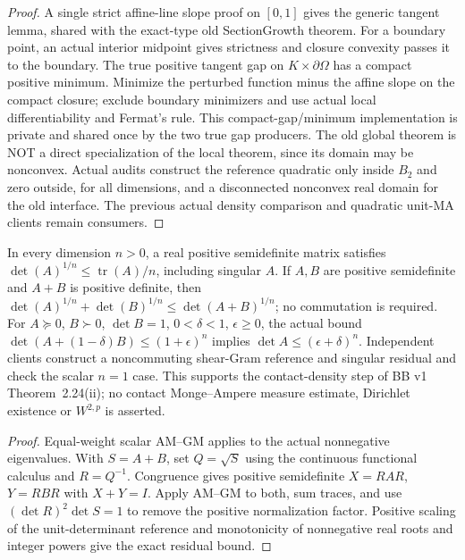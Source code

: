 \begin{proof}
  \leanok
  A single strict affine-line slope proof on $[0,1]$ gives the generic tangent
  lemma, shared with the exact-type old SectionGrowth theorem. For a boundary
  point, an actual interior midpoint gives strictness and closure convexity
  passes it to the boundary. The true positive tangent gap on
  $K\times\partial\Omega$ has a compact positive minimum. Minimize the perturbed
  function minus the affine slope on the compact closure; exclude boundary
  minimizers and use actual local differentiability and Fermat's rule.
  This compact-gap/minimum implementation is private and shared once by the two
  true gap producers. The old global theorem is NOT a direct specialization of
  the local theorem, since its domain may be nonconvex. Actual audits construct
  the reference quadratic only inside $B_2$ and zero outside, for all dimensions,
  and a disconnected nonconvex real domain for the old interface. The previous
  actual density comparison and quadratic unit-MA clients remain consumers.
\end{proof}


\begin{lemma}
  \label{lem:matrix-determinant-minkowski}
  \leanok
  In every dimension $n>0$, a real positive semidefinite matrix satisfies
  $\det(A)^{1/n}\le\operatorname{tr}(A)/n$, including singular $A$.
  If $A,B$ are positive semidefinite and $A+B$ is positive definite, then
  $\det(A)^{1/n}+\det(B)^{1/n}\le\det(A+B)^{1/n}$; no commutation is required.
  For $A\succeq0$, $B\succ0$, $\det B=1$, $0<\delta<1$, $\epsilon\ge0$,
  the actual bound $\det(A+(1-\delta)B)\le(1+\epsilon)^n$ implies
  $\det A\le(\epsilon+\delta)^n$. Independent clients construct a noncommuting
  shear-Gram reference and singular residual and check the scalar $n=1$ case.
  This supports the contact-density step of BB v1 Theorem~2.24(ii); no contact
  Monge--Ampere measure estimate, Dirichlet existence or $W^{2,p}$ is asserted.
\end{lemma}
\begin{proof}
  \leanok
  Equal-weight scalar AM--GM applies to the actual nonnegative eigenvalues.
  With $S=A+B$, set $Q=\sqrt S$ using the continuous functional calculus and
  $R=Q^{-1}$. Congruence gives positive semidefinite $X=RAR$, $Y=RBR$ with
  $X+Y=I$. Apply AM--GM to both, sum traces, and use
  $(\det R)^2\det S=1$ to remove the positive normalization factor.
  Positive scaling of the unit-determinant reference and monotonicity of
  nonnegative real roots and integer powers give the exact residual bound.
\end{proof}


